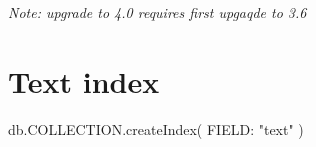 \textit{Note: upgrade to 4.0 requires first upgaqde to 3.6}



\section*{Text index}

db.COLLECTION.createIndex( { FIELD: "text" } )












